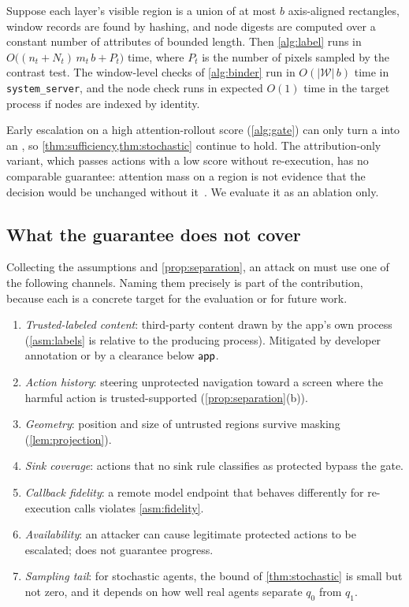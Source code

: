 \begin{proposition}\label{prop:complexity}
Suppose each layer's visible region is a union of at most $b$ axis-aligned rectangles, window records are found by hashing, and node digests are computed over a constant number of attributes of bounded length. Then \cref{alg:label} runs in $O\bigl((n_t+N_t)\,m_t\,b+P_t\bigr)$ time, where $P_t$ is the number of pixels sampled by the contrast test. The window-level checks of \cref{alg:binder} run in $O(|\mathcal{W}|\,b)$ time in \texttt{system\_server}, and the node check runs in expected $O(1)$ time in the target process if nodes are indexed by identity.
\end{proposition}

\begin{remark}\label{rem:attention}
Early escalation on a high attention-rollout score (\cref{alg:gate}) can only turn a \PASS{} into an \ESC{}, so \cref{thm:sufficiency,thm:stochastic} continue to hold. The attribution-only variant, which passes actions with a low score without re-execution, has no comparable guarantee: attention mass on a region is not evidence that the decision would be unchanged without it~\cite{jain2019attention}. We evaluate it as an ablation only.
\end{remark}

\subsection{What the guarantee does not cover}\label{sec:theory-gaps}

Collecting the assumptions and \cref{prop:separation}, an attack on \PG{} must use one of the following channels. Naming them precisely is part of the contribution, because each is a concrete target for the evaluation or for future work.
\begin{enumerate}[label=(G\arabic*)]
  \item \emph{Trusted-labeled content}: third-party content drawn by the app's own process (\cref{asm:labels} is relative to the producing process). Mitigated by developer annotation or by a clearance below $\textsf{app}$.
  \item \emph{Action history}: steering unprotected navigation toward a screen where the harmful action is trusted-supported (\cref{prop:separation}(b)).
  \item \emph{Geometry}: position and size of untrusted regions survive masking (\cref{lem:projection}).
  \item \emph{Sink coverage}: actions that no sink rule classifies as protected bypass the gate.
  \item \emph{Callback fidelity}: a remote model endpoint that behaves differently for re-execution calls violates \cref{asm:fidelity}.
  \item \emph{Availability}: an attacker can cause legitimate protected actions to be escalated; \PG{} does not guarantee progress.
  \item \emph{Sampling tail}: for stochastic agents, the bound of \cref{thm:stochastic} is small but not zero, and it depends on how well real agents separate $q_0$ from $q_1$.
\end{enumerate}
